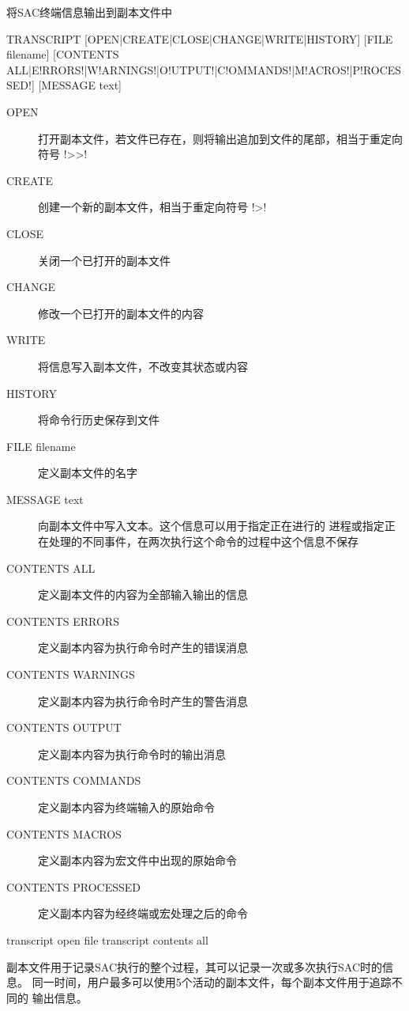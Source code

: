 \label{cmd:transcript}

将SAC终端信息输出到副本文件中

\begin{SACSTX}
TRANSCRIPT [OPEN|CREATE|CLOSE|CHANGE|WRITE|HISTORY] [FILE filename]
    [CONTENTS ALL|E!RRORS!|W!ARNINGS!|O!UTPUT!|C!OMMANDS!|M!ACROS!|P!ROCESSED!]
    [MESSAGE text]
\end{SACSTX}

\begin{description}
\item [OPEN] 打开副本文件，若文件已存在，则将输出追加到文件的尾部，相当于重定向符号 !>>!
\item [CREATE] 创建一个新的副本文件，相当于重定向符号 !>!
\item [CLOSE] 关闭一个已打开的副本文件
\item [CHANGE] 修改一个已打开的副本文件的内容
\item [WRITE] 将信息写入副本文件，不改变其状态或内容
\item [HISTORY] 将命令行历史保存到文件
\item [FILE filename] 定义副本文件的名字
\item [MESSAGE text] 向副本文件中写入文本。这个信息可以用于指定正在进行的
    进程或指定正在处理的不同事件，在两次执行这个命令的过程中这个信息不保存
\item [CONTENTS ALL] 定义副本文件的内容为全部输入输出的信息
\item [CONTENTS ERRORS] 定义副本内容为执行命令时产生的错误消息
\item [CONTENTS WARNINGS] 定义副本内容为执行命令时产生的警告消息
\item [CONTENTS OUTPUT] 定义副本内容为执行命令时的输出消息
\item [CONTENTS COMMANDS] 定义副本内容为终端输入的原始命令
\item [CONTENTS MACROS] 定义副本内容为宏文件中出现的原始命令
\item [CONTENTS PROCESSED] 定义副本内容为经终端或宏处理之后的命令
\end{description}

\begin{SACDFT}
transcript open file transcript contents all
\end{SACDFT}

副本文件用于记录SAC执行的整个过程，其可以记录一次或多次执行SAC时的信息。
同一时间，用户最多可以使用5个活动的副本文件，每个副本文件用于追踪不同的
输出信息。

